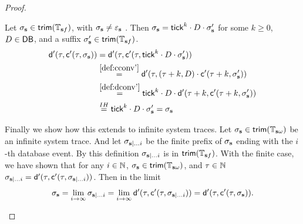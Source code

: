 \begin{proof}
\begin{enumerate}
\begin{enumerate}
                Let $\sigma_{\mathbf{s}} \in \mathsf{trim}(\mathbb{T}_{\mathbf{s} f})$,
                with $\sigma_{\mathbf{s}} \neq \varepsilon_{\mathbf{s}}$ .
                Then $\sigma_{\mathbf{s}} = \mathsf{tick}^k \cdot D \cdot \sigma_{\mathbf{s}}'$
                for some $k \geq 0$, $D \in \mathsf{DB}$,
                and a suffix $\sigma_{\mathbf{s}}' \in \mathsf{trim}(\mathbb{T}_{\mathbf{s} f})$.
                \begin{align*}
                    \mathsf{d}'(\tau, \mathsf{c}'(\tau, \sigma_{\mathbf{s}})) &=
                    \mathsf{d}'(\tau, \mathsf{c}'(\tau, \mathsf{tick}^k \cdot D \cdot \sigma_{\mathbf{s}}')) \\
                    &\stackrel{\ref{def:cconv'}}{=}
                        \mathsf{d}'(\tau, (\tau+k, D) \cdot \mathsf{c}'(\tau+k, \sigma_{\mathbf{s}}')) \\
                    &\stackrel{\ref{def:dconv'}}{=}
                        \mathsf{tick}^k \cdot D \cdot
                        \mathsf{d}'(\tau+k, \mathsf{c}'(\tau+k, \sigma_{\mathbf{s}}')) \\
                    &\stackrel{IH}{=}
                        \mathsf{tick}^k \cdot D \cdot \sigma_{\mathbf{s}}'
                    = \sigma_{\mathbf{s}}
                \end{align*}

                Finally we show how this extends to infinite system
                traces.
                Let $\sigma_{\mathbf{s}} \in \mathsf{trim}(\mathbb{T}_{\mathbf{s} \omega})$ be an
                infinite system trace.
                And let $\sigma_{\mathbf{s} | \dots i}$ be the finite prefix
                of $\sigma_{\mathbf{s}}$ ending with the $i$-th
                database event.
                By this definition
                $\sigma_{\mathbf{s} |\dots i}$ is in $\mathsf{trim}(\mathbb{T}_{\mathbf{s} f})$.
                With the finite case, we have shown that
                for any $i \in \mathbb{N}$, $\sigma_{\mathbf{s}} \in \mathsf{trim}(\mathbb{T}_{\mathbf{s} \omega})$,
                and $\tau \in \mathbb{N}$
                $ \sigma_{\mathbf{s} |\dots i} =
                    \mathsf{d}'(\tau, \mathsf{c}'(\tau, \sigma_{\mathbf{s} | \dots i}))$.
                Then in the limit
                \begin{equation*}
                    \sigma_{\mathbf{s}} =
                    \lim_{i \to \infty}
                    \sigma_{\mathbf{s} |\dots i} =
                    \lim_{i \to \infty}
                    \mathsf{d}'(\tau, \mathsf{c}'(\tau, \sigma_{\mathbf{s} | \dots i})) =
                    \mathsf{d}'(\tau, \mathsf{c}'(\tau, \sigma_{\mathbf{s}})).
                \end{equation*}
                
            \end{enumerate}
        
    \end{enumerate}

\end{proof}
